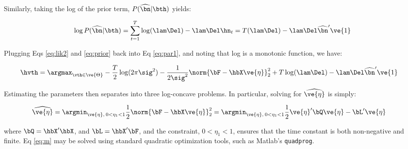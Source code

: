 \noindent Similarly, taking the log of the prior term, $P(\hnm | \bth )$ yields:

\begin{align} \label{eq:prior}
\log P(\hnm | \bth) =  \sum _{t=1}^T \log(\lam \Del)  -\lam \Del \hn_t =T (\lam \Del) - \lam \Del \hnm' \ve{1} 
\end{align}

\noindent Plugging Eqs \eqref{eq:lik2} and \eqref{eq:prior} back into Eq \eqref{eq:par1}, and noting that log is a monotonic function, we have:



\begin{align} 
\hvth &=\argmax_{\vth \in \ve{\Theta}} - \frac{T}{2} \log (2\pi\sig^2) - \frac{1}{2\sig^2} \norm{\bF - \hbX \ve{\eta}}_2^2 + T \log (\lam \Del) - \lam \Del \hnm' \ve{1} \label{eq:par} 
\end{align}

\noindent %
Estimating the parameters then separates into three log-concave problems.  In particular, solving for $\widehat{\ve{\eta}}$ is simply:

\begin{align} 
\widehat{\ve{\eta}} &= \argmin_{\ve{\eta},\: 0< \eta_1<1} \frac{1}{2} \norm{\bF - \hbX \ve{\eta}}_2^2 
=  \argmin_{\ve{\eta},\: 0< \eta_1<1} \frac{1}{2} \ve{\eta}' \bQ  \ve{\eta} - \bL'  \ve{\eta} \label{eq:m} 
\end{align}

\noindent where $\bQ=\hbX' \hbX$, and $\bL=\hbX' \bF$, and the constraint, $0<\eta_1<1$, ensures that the time constant is both non-negative and finite.  Eq \eqref{eq:m} may be solved using standard quadratic optimization tools, such as Matlab's \texttt{quadprog}.  

